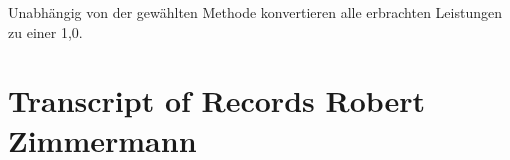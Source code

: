 \documentclass[12pt]{scrartcl}
\begin{document}
 Unabhängig von der gewählten Methode konvertieren alle erbrachten Leistungen zu einer 1,0.
\newpage



\newpage

\appendix
{}
\vspace*{\fill}
\hspace*{\fill}

\section{Transcript of Records Robert Zimmermann}
\label{transcript}

\hspace*{\fill}
\vspace*{\fill}


\label{bsp_anw}
\end{document}
